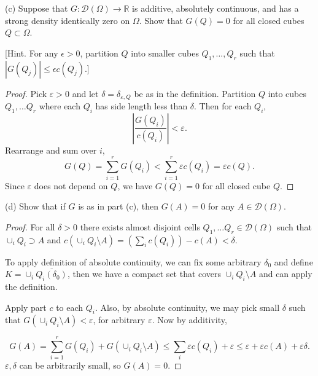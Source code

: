 \newpage
(c) Suppose that $G: \mathcal{D}(\Omega) \rightarrow \mathbb{R}$ is additive, absolutely continuous, and has a strong density identically zero on $\Omega$. Show that $G(Q)=0$ for all closed cubes $Q \subset \Omega$.

[Hint. For any $\epsilon>0$, partition $Q$ into smaller cubes $Q_{1}, \ldots, Q_{r}$ such that $\left|G\left(Q_{j}\right)\right| \leq \epsilon c\left(Q_{j}\right)$.]
\begin{proof}
	Pick $\varepsilon>0$ and let $\delta = \delta_{\varepsilon, Q}$ be as in the definition. Partition $Q$ into cubes $Q_1, \ldots Q_r$ where each $Q_i$ has side length less than  $\delta$. Then for each $Q_i$,
	\[
		\left| \frac{G(Q_i)}{c(Q_i)}  \right| < \varepsilon
	.\] 
	Rearrange and sum over $i$,
	\[
		G(Q) 
		= \sum_{i = 1}^r G(Q_i)
		< \sum_{i = 1}^r \varepsilon c(Q_i)
		= \varepsilon c(Q)
	.\] 
	Since $\varepsilon$ does not depend on $Q$, we have $G(Q) = 0$ for all closed cube $Q$.
\end{proof}


\newpage
(d) Show that if $G$ is as in part (c), then $G(A)=0$ for any $A \in \mathcal{D}(\Omega)$.

\begin{proof}
	For all $\delta>0$ there exists almost disjoint cells $Q_1,\ldots Q_r \in \mathcal{D}(\Omega)$ such that $\cup_i Q_i \supset A$ and $c(\cup_i Q_i \setminus A) = \left(\sum_i c(Q_i)\right) - c(A) < \delta$.

	To apply definition of absolute continuity, we can fix some arbitrary $\delta_0$ and define $K = \cup_i \overline{ Q_i(\delta_0)}$, then we have a compact set that covers $\cup_i Q_i \setminus A$ and can apply the definition.

	Apply part $c$ to each $Q_i$. Also, by absolute continuity, we may pick small $\delta$ such that $G(\cup _i Q_i \setminus A) < \varepsilon$, for arbitrary $\varepsilon$. Now by additivity,

	 \[
		G(A) = \sum_{i = 1}^r G(Q_i) + G(\cup_i Q_i \setminus A) \le \sum_{i} \varepsilon c(Q_i) + \varepsilon \le \varepsilon + \varepsilon c(A) + \varepsilon \delta
	.\] 
	$\varepsilon, \delta$ can be arbitrarily small, so $G(A) = 0$.
\end{proof}


